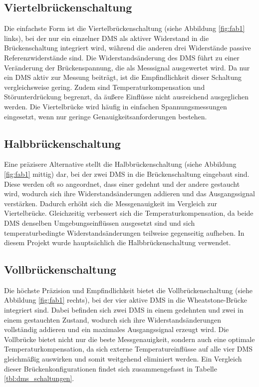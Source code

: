 \subsection{Viertelbrückenschaltung}
Die einfachste Form ist die Viertelbrückenschaltung (siehe Abbildung \ref{fig:fab1} links), bei der nur ein einzelner DMS als aktiver Widerstand in die Brückenschaltung integriert wird, während die anderen drei Widerstände passive Referenzwiderstände sind. Die Widerstandsänderung des DMS führt zu einer Veränderung der Brückenspannung, die als Messsignal ausgewertet wird. Da nur ein DMS aktiv zur Messung beiträgt, ist die Empfindlichkeit dieser Schaltung vergleichsweise gering. Zudem sind Temperaturkompensation und Störunterdrückung begrenzt, da äußere Einflüsse nicht ausreichend ausgeglichen werden. Die Viertelbrücke wird häufig in einfachen Spannungsmessungen eingesetzt, wenn nur geringe Genauigkeitsanforderungen bestehen.

\subsection{Halbbrückenschaltung}

Eine präzisere Alternative stellt die Halbbrückenschaltung  (siehe Abbildung \ref{fig:fab1} mittig) dar, bei der zwei DMS in die Brückenschaltung eingebaut sind. Diese werden oft so angeordnet, dass einer gedehnt und der andere gestaucht wird, wodurch sich ihre Widerstandsänderungen addieren und das Ausgangssignal verstärken. Dadurch erhöht sich die Messgenauigkeit im Vergleich zur Viertelbrücke. Gleichzeitig verbessert sich die Temperaturkompensation, da beide DMS denselben Umgebungseinflüssen ausgesetzt sind und sich temperaturbedingte Widerstandsänderungen teilweise gegenseitig aufheben. In diesem Projekt wurde hauptsächlich die Halbbrückenschaltung verwendet.

\subsection{Vollbrückenschaltung}
Die höchste Präzision und Empfindlichkeit bietet die Vollbrückenschaltung  (siehe Abbildung \ref{fig:fab1} rechts), bei der vier aktive DMS in die Wheatstone-Brücke integriert sind. Dabei befinden sich zwei DMS in einem gedehnten und zwei in einem gestauchten Zustand, wodurch sich ihre Widerstandsänderungen vollständig addieren und ein maximales Ausgangssignal erzeugt wird. Die Vollbrücke bietet nicht nur die beste Messgenauigkeit, sondern auch eine optimale Temperaturkompensation, da sich externe Temperatureinflüsse auf alle vier DMS gleichmäßig auswirken und somit weitgehend eliminiert werden.
Ein Vergleich dieser Brückenkonfigurationen findet sich zusammengefasst in Tabelle \ref{tbl:dms_schaltungen}.


